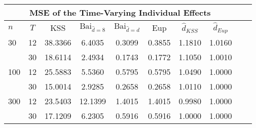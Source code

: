 \begin{tabular}{lccccccccc} 
\hline \multicolumn{8}{c}{MSE of the Time-Varying Individual Effects} \\ \hline 
$n$ & $T$ & KSS & $ \text{Bai}_{\hat{d} = 8}$ & $\text{Bai}_{\hat{d} = d}$ & Eup & $\hat{d}_{KSS}$ & $\hat{d}_{Eup}$ \\
\hline
30 & 12 &  38.3366  &  6.4035  &  0.3099  &  0.3855  &  1.1810  &  1.0160  \\
& 30 &  18.6114  &  2.4934  &  0.1743  &  0.1772  &  1.1050  &  1.0010  \\
100 & 12 &  25.5883  &  5.5360  &  0.5795  &  0.5795  &  1.0490  &  1.0000  \\
& 30 &  15.0014  &  2.9285  &  0.2658  &  0.2658  &  1.0110  &  1.0000  \\
300 & 12 &  23.5403  &  12.1399  &  1.4015  &  1.4015  &  0.9980  &  1.0000  \\
& 30 &  17.1209  &  6.2305  &  0.5916  &  0.5916  &  1.0000  &  1.0000  \\
\end{tabular} 
